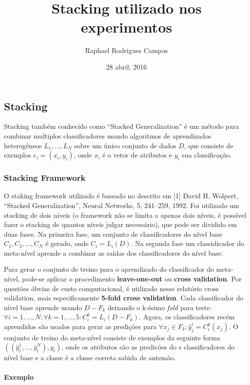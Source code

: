 \documentclass[]{article}
\title{Stacking utilizado nos experimentos}
\author{Raphael Rodrigues Campos}
\date{28 abril, 2016}
\begin{document}
\maketitle


\subsection{Stacking}\label{stacking}

Stacking também conhecido como ``Stacked Generalization'' é um método
para combinar multiplos classificadores usando algoritmos de
aprendizados heterogêneos \(L_1, ..., L_N\) sobre um único conjunto de
dados \(D\), que consiste de exemplos \(e_i = (x_i, y_i)\), onde \(x_i\)
é o vetor de atributos e \(y_i\) sua classificação.

\subsubsection{Stacking Framework}\label{stacking-framework}

O staking framework utilizado é baseado no descrito em {[}1{]} David H.
Wolpert, ``Stacked Generalization'', Neural Networks, 5, 241--259, 1992.
Foi utilizado um stacking de dois níveis (o framework não se limita a
apenas dois níveis, é possível fazer o stacking de quantos níveis julgar
necessário), que pode ser dividido em duas fases. Na primeira fase, um
conjunto de classificadores do nível base \(C_1, C_2, ..., C_N\) é
gerado, onde \(C_i = L_i(D)\). Na segunda fase um classidicador do
meta-nível aprende a combinar as saídas dos classificadores do nível
base.

Para gerar o conjunto de treino para o aprendizado do classificador do
meta-nível, pode-se aplicar o procedimento \textbf{leave-one-out} ou
\textbf{cross validation}. Por questões óbvias de custo computacional, é
utilizado nesse relatório cross validation, mais especificamente
\textbf{5-fold cross validation}. Cada classificador do nível base
aprende usando \(D - F_k\) deixando o k-ésimo \emph{fold} para teste:
\(\forall i = 1,...,N : \forall k = 1,...,5 : C^{k}_i = L_i(D-F_k)\).
Agora, os classificadores recém aprendidos são usados para gerar as
predições para \(\forall x_j \in F_k:\hat{y}_j^i=C^k_i(x_j)\). O
conjunto de treino do meta-nível consiste de exemplos da seguinte forma
\(((\hat{y}_i^1,..., \hat{y}_i^N), y_i)\), onde os atributos são as
predicóes do s classificadores do nível base e a classe é a classe
correta sabida de antemão.

\paragraph{Exemplo}\label{exemplo}
\end{document}
